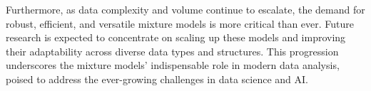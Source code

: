 \documentclass{article}
\begin{document}
Furthermore, as data complexity and volume continue to escalate, the demand for robust, efficient, and versatile mixture models is more critical than ever. Future research is expected to concentrate on scaling up these models and improving their adaptability across diverse data types and structures. This progression underscores the mixture models' indispensable role in modern data analysis, poised to address the ever-growing challenges in data science and AI.

% 

\printbibliography
\end{document}
